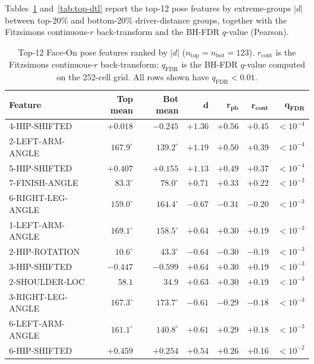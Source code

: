 \documentclass[11pt,a4paper]{article}
\begin{document}
Tables~\ref{tab:top-faceon} and~\ref{tab:top-dtl} report the top-12 pose features by extreme-groups
$|d|$ between top-20\% and bottom-20\% driver-distance groups, together with the Fitzsimons continuous-$r$
back-transform and the BH-FDR $q$-value (Pearson).

\begin{table}[h]
\centering
\small
\caption{Top-12 Face-On pose features ranked by $|d|$ ($n_\text{top}=n_\text{bot}=123$).
         $r_{\text{cont}}$ is the Fitzsimons continuous-$r$ back-transform; $q_{\text{FDR}}$ is the BH-FDR
         $q$-value computed on the 252-cell grid.  All rows shown have $q_{\text{FDR}}<0.01$.}
\label{tab:top-faceon}
\begin{tabular}{lrrrrrr}
\toprule
\textbf{Feature} & \textbf{Top mean} & \textbf{Bot mean} & $\boldsymbol{d}$ & $\boldsymbol{r_{\text{pb}}}$ & $\boldsymbol{r_{\text{cont}}}$ & $\boldsymbol{q_{\text{FDR}}}$ \\
\midrule
4-HIP-SHIFTED        & $+0.018$        & $-0.245$        & $+1.36$ & $+0.56$ & $+0.45$ & ${<}10^{-4}$ \\
2-LEFT-ARM-ANGLE     & $167.9^{\circ}$ & $139.2^{\circ}$ & $+1.19$ & $+0.50$ & $+0.39$ & ${<}10^{-4}$ \\
5-HIP-SHIFTED        & $+0.407$        & $+0.155$        & $+1.13$ & $+0.49$ & $+0.37$ & ${<}10^{-4}$ \\
7-FINISH-ANGLE       & $83.3^{\circ}$  & $78.0^{\circ}$  & $+0.71$ & $+0.33$ & $+0.22$ & ${<}10^{-3}$ \\
6-RIGHT-LEG-ANGLE    & $159.0^{\circ}$ & $164.4^{\circ}$ & $-0.67$ & $-0.31$ & $-0.20$ & ${<}10^{-3}$ \\
1-LEFT-ARM-ANGLE     & $169.1^{\circ}$ & $158.5^{\circ}$ & $+0.64$ & $+0.30$ & $+0.19$ & ${<}10^{-3}$ \\
2-HIP-ROTATION       & $10.6^{\circ}$  & $43.3^{\circ}$  & $-0.64$ & $-0.30$ & $-0.19$ & ${<}10^{-3}$ \\
3-HIP-SHIFTED        & $-0.447$        & $-0.599$        & $+0.64$ & $+0.30$ & $+0.19$ & ${<}10^{-3}$ \\
2-SHOULDER-LOC       & $58.1$          & $34.9$          & $+0.63$ & $+0.30$ & $+0.19$ & ${<}10^{-3}$ \\
3-RIGHT-LEG-ANGLE    & $167.3^{\circ}$ & $173.7^{\circ}$ & $-0.61$ & $-0.29$ & $-0.18$ & ${<}10^{-3}$ \\
6-LEFT-ARM-ANGLE     & $161.1^{\circ}$ & $140.8^{\circ}$ & $+0.61$ & $+0.29$ & $+0.18$ & ${<}10^{-3}$ \\
6-HIP-SHIFTED        & $+0.459$        & $+0.254$        & $+0.54$ & $+0.26$ & $+0.16$ & ${<}10^{-2}$ \\
\bottomrule
\end{tabular}
\end{table}
\end{document}
